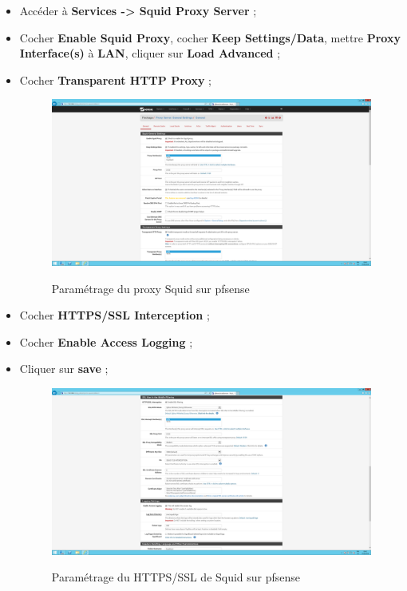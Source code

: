 \begin{itemize}
   \item Accéder à \textbf{Services -> Squid Proxy Server} ;
   \item Cocher \textbf{Enable Squid Proxy}, cocher \textbf{Keep Settings/Data}, mettre \textbf{Proxy Interface(s)} à \textbf{LAN}, cliquer sur \textbf{Load Advanced} ;
   \item Cocher \textbf{Transparent HTTP Proxy} ;
\begin{figure}[h!]
    \begin{center}
        \includegraphics[scale=0.20]{Pfsense_Screeshots/interception/15.png}
        \label{Pfsense_Screeshots/interception/15}
        \caption{Paramétrage du proxy Squid sur pfsense}
    \end{center}
\end{figure}
\FloatBarrier 
    
    \item Cocher \textbf{HTTPS/SSL Interception} ;
    \item Cocher \textbf{Enable Access Logging} ;
    \item Cliquer sur \textbf{save} ;
\begin{figure}[h!]
    \begin{center}
        \includegraphics[scale=0.20]{Pfsense_Screeshots/interception/16.png}
        \label{Pfsense_Screeshots/interception/16}
        \caption{Paramétrage du HTTPS/SSL de Squid sur pfsense}
    \end{center}
\end{figure}
\FloatBarrier 
    

\end{itemize}
